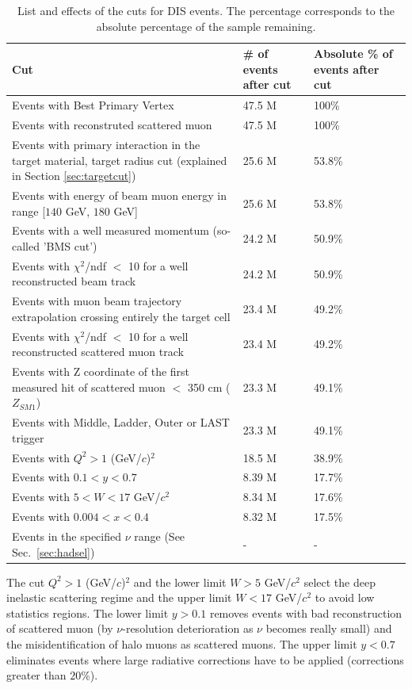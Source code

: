 \begin{table}[!h]
  \centering
  \caption{List and effects of the cuts for DIS events. The percentage corresponds to the absolute percentage of the sample remaining.}
  \label{tab:DIScuts}
  \begin{tabular}{p{10cm} p{2cm} p{2cm}}
    \hline
    \hline
     Cut & \# of events after cut & Absolute \% of events after cut  \\
    \hline
    \hline
    Events with Best Primary Vertex & 47.5 M & 100\% \\
    Events with reconstruted scattered muon & 47.5 M & 100\% \\
    Events with primary interaction in the target material, target radius cut (explained in Section \ref{sec:targetcut}) & 25.6 M & 53.8\% \\
    Events with energy of beam muon energy in range [$140$ GeV, $180$ GeV] & 25.6 M & 53.8\% \\
    Events with a well measured momentum (so-called 'BMS cut') & 24.2 M & 50.9\% \\
    Events with $\chi^2$/ndf $<$ 10 for a well reconstructed beam track & 24.2 M & 50.9\% \\
    Events with muon beam trajectory extrapolation crossing entirely the target cell & 23.4 M & 49.2\% \\
    Events with $\chi^2$/ndf $<$ 10 for a well reconstructed scattered muon track & 23.4 M & 49.2\% \\
    Events with Z coordinate of the first measured hit of scattered muon $<$ 350 cm ($Z_{SM1}$) & 23.3 M & 49.1\% \\
    Events with Middle, Ladder, Outer or LAST trigger & 23.3 M & 49.1\% \\
    Events with $Q^2>1$ (GeV/$c$)$^2$ & 18.5 M & 38.9\% \\
    Events with $0.1 < y < 0.7$ & 8.39 M & 17.7\% \\
    Events with $5 < W < 17$ GeV/$c^2$ & 8.34 M & 17.6\% \\
    Events with $0.004 < x < 0.4$ & 8.32 M & 17.5\% \\
    Events in the specified $\nu$ range (See Sec.~\ref{sec:hadsel}) & - & - \\
    \hline
    \hline
  \end{tabular}
\end{table}

The cut $Q^2>1$ (GeV/$c$)$^2$ and the lower limit $W > 5$ GeV/$c^2$ select the deep inelastic scattering regime and the upper limit $W < 17$ GeV/$c^2$ to avoid low statistics regions. The lower limit $y > 0.1$ removes events with bad reconstruction of scattered muon (by $\nu$-resolution deterioration as $\nu$ becomes really small) and the misidentification of halo muons as scattered muons. The upper limit $y < 0.7$ eliminates events where large radiative corrections have to be applied (corrections greater than $20$\%).

